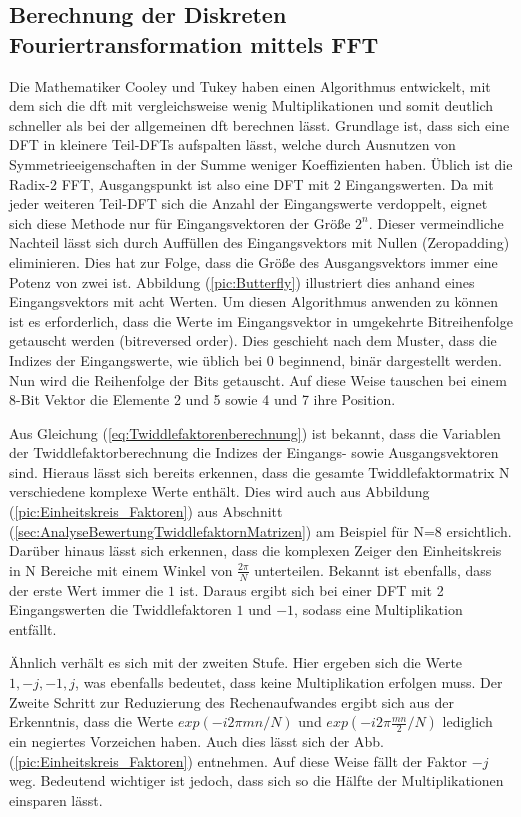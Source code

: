 \subsection{Berechnung der Diskreten Fouriertransformation mittels FFT}\label{sec:BerechnungFFT}
Die Mathematiker Cooley und Tukey haben einen Algorithmus entwickelt, mit dem sich die \gls{dft} mit vergleichsweise wenig Multiplikationen
und somit deutlich schneller als bei der allgemeinen \gls{dft} berechnen lässt. Grundlage ist, dass sich eine DFT
in kleinere Teil-DFTs aufspalten lässt, welche durch Ausnutzen von Symmetrieeigenschaften in der Summe weniger Koeffizienten haben. 
Üblich ist die Radix-2 FFT, Ausgangspunkt ist also eine DFT mit 2 Eingangswerten.
Da mit jeder weiteren Teil-DFT sich die Anzahl der Eingangswerte verdoppelt, eignet sich diese Methode nur für Eingangsvektoren der Größe $2^n$. Dieser
vermeindliche Nachteil lässt sich durch Auffüllen des Eingangsvektors mit Nullen (Zeropadding) eliminieren. Dies hat zur Folge, dass die Größe des Ausgangsvektors
immer eine Potenz von zwei ist. Abbildung (\ref{pic:Butterfly}) illustriert dies anhand eines Eingangsvektors mit acht Werten. 
Um diesen Algorithmus anwenden zu können ist es erforderlich, dass die Werte im Eingangsvektor in umgekehrte Bitreihenfolge getauscht werden (bitreversed order).
Dies geschieht nach dem Muster, dass die Indizes der Eingangswerte, wie
üblich bei 0 beginnend, binär dargestellt werden. Nun wird die Reihenfolge der Bits getauscht. Auf diese Weise tauschen bei einem 8-Bit Vektor die
Elemente 2 und 5 sowie 4 und 7 ihre Position.

Aus Gleichung (\ref{eq:Twiddlefaktorenberechnung}) ist 
bekannt, dass die Variablen der Twiddlefaktorberechnung die Indizes der Eingangs- sowie Ausgangsvektoren sind. Hieraus lässt sich bereits erkennen, dass
die gesamte Twiddlefaktormatrix N verschiedene komplexe Werte enthält. Dies wird auch aus Abbildung (\ref{pic:Einheitskreis_Faktoren}) aus Abschnitt 
(\ref{sec:AnalyseBewertungTwiddlefaktornMatrizen}) am Beispiel für N=8 ersichtlich. Darüber hinaus lässt sich erkennen, dass die komplexen Zeiger den Einheitskreis 
in N Bereiche mit einem Winkel von $\frac{2 \pi}{N}$ unterteilen. Bekannt ist ebenfalls, dass der erste Wert immer die $1$ ist.
Daraus ergibt sich bei einer DFT mit 2 Eingangswerten die Twiddlefaktoren $1$ und $-1$, sodass eine Multiplikation entfällt. 

Ähnlich verhält es sich mit der zweiten Stufe.
Hier ergeben sich die Werte $1, -j, -1, j$, was ebenfalls bedeutet, dass keine Multiplikation erfolgen muss. Der Zweite Schritt zur Reduzierung des Rechenaufwandes ergibt sich
aus der Erkenntnis, dass die Werte $exp(-i 2 \pi m n/N)$ und $exp(-i 2 \pi \frac{m n}{2}/N)$ lediglich ein negiertes Vorzeichen haben. Auch dies lässt sich der Abb. 
(\ref{pic:Einheitskreis_Faktoren}) entnehmen. Auf diese Weise fällt der Faktor $-j$ weg. Bedeutend wichtiger ist jedoch, dass sich so die Hälfte der Multiplikationen einsparen lässt.

